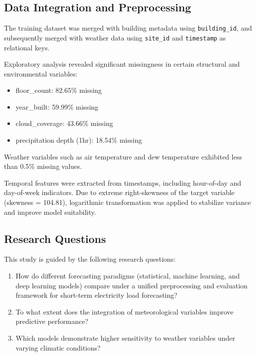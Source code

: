 \documentclass[conference]{IEEEtran}
\begin{document}
\subsection{Data Integration and Preprocessing}

The training dataset was merged with building metadata using \texttt{building\_id}, and subsequently merged with weather data using \texttt{site\_id} and \texttt{timestamp} as relational keys.

Exploratory analysis revealed significant missingness in certain structural and environmental variables:

\begin{itemize}
    \item floor\_count: 82.65\% missing
    \item year\_built: 59.99\% missing
    \item cloud\_coverage: 43.66\% missing
    \item precipitation depth (1hr): 18.54\% missing
\end{itemize}

Weather variables such as air temperature and dew temperature exhibited less than 0.5\% missing values.

Temporal features were extracted from timestamps, including hour-of-day and day-of-week indicators. Due to extreme right-skewness of the target variable (skewness = 104.81), logarithmic transformation was applied to stabilize variance and improve model suitability.


\subsection{Research Questions}

This study is guided by the following research questions:

\begin{enumerate}
    \item How do different forecasting paradigms (statistical, machine learning, and deep learning models) compare under a unified preprocessing and evaluation framework for short-term electricity load forecasting?

    \item To what extent does the integration of meteorological variables improve predictive performance?

    \item Which models demonstrate higher sensitivity to weather variables under varying climatic conditions?
\end{enumerate}
\end{document}
